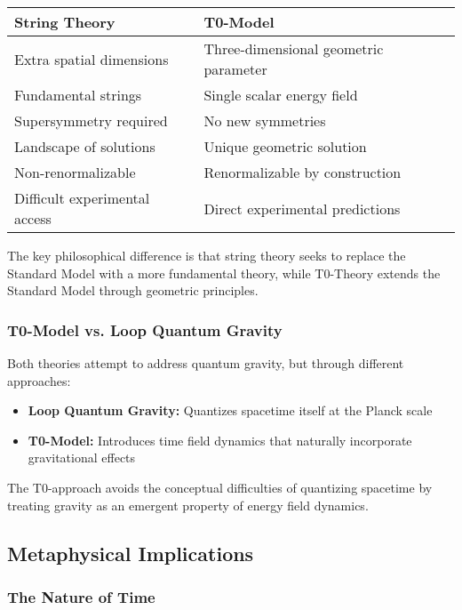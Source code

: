 \documentclass[12pt,a4paper]{article}
\theoremstyle{definition}
\begin{document}
	\begin{center}
		\begin{tabular}{p{7cm}p{7cm}}
			\toprule
			\textbf{String Theory} & \textbf{T0-Model} \\
			\midrule
			Extra spatial dimensions & Three-dimensional geometric parameter \\
			Fundamental strings & Single scalar energy field \\
			Supersymmetry required & No new symmetries \\
			Landscape of solutions & Unique geometric solution \\
			Non-renormalizable & Renormalizable by construction \\
			Difficult experimental access & Direct experimental predictions \\
			\bottomrule
		\end{tabular}
	\end{center}
	
	The key philosophical difference is that string theory seeks to replace the Standard Model with a more fundamental theory, while T0-Theory extends the Standard Model through geometric principles.
	
	\subsubsection{T0-Model vs. Loop Quantum Gravity}
	
	Both theories attempt to address quantum gravity, but through different approaches:
	
	\begin{itemize}
		\item \textbf{Loop Quantum Gravity:} Quantizes spacetime itself at the Planck scale
		\item \textbf{T0-Model:} Introduces time field dynamics that naturally incorporate gravitational effects
	\end{itemize}
	
	The T0-approach avoids the conceptual difficulties of quantizing spacetime by treating gravity as an emergent property of energy field dynamics.
	
	\subsection{Metaphysical Implications}
	
	\subsubsection{The Nature of Time}
	
\end{document}
